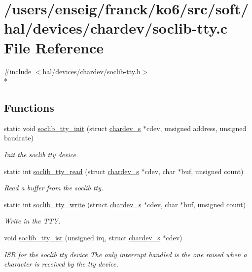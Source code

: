 \hypertarget{soclib-tty_8c}{\section{/users/enseig/franck/ko6/src/soft/hal/devices/chardev/soclib-\/tty.c File Reference}
\label{soclib-tty_8c}
}
{\ttfamily \#include $<$hal/devices/chardev/soclib-\/tty.\-h$>$}\\*
\subsection*{Functions}
\begin{DoxyCompactItemize}
\item 
static void \hyperlink{soclib-tty_8c_a00359850c297b2f0c2cf249274763e04}{soclib\-\_\-tty\-\_\-init} (struct \hyperlink{structchardev__s}{chardev\-\_\-s} $\ast$cdev, unsigned address, unsigned baudrate)
\begin{DoxyCompactList}\small\item\em Init the soclib tty device. \end{DoxyCompactList}\item 
static int \hyperlink{soclib-tty_8c_a4431857eb67ef282186a88fda6dcd89e}{soclib\-\_\-tty\-\_\-read} (struct \hyperlink{structchardev__s}{chardev\-\_\-s} $\ast$cdev, char $\ast$buf, unsigned count)
\begin{DoxyCompactList}\small\item\em Read a buffer from the soclib tty. \end{DoxyCompactList}\item 
static int \hyperlink{soclib-tty_8c_a6abd23ad0092762798c155784b37d60a}{soclib\-\_\-tty\-\_\-write} (struct \hyperlink{structchardev__s}{chardev\-\_\-s} $\ast$cdev, char $\ast$buf, unsigned count)
\begin{DoxyCompactList}\small\item\em Write in the T\-T\-Y. \end{DoxyCompactList}\item 
void \hyperlink{soclib-tty_8c_abee08020bafa1f698839a8d477dcdafa}{soclib\-\_\-tty\-\_\-isr} (unsigned irq, struct \hyperlink{structchardev__s}{chardev\-\_\-s} $\ast$cdev)
\begin{DoxyCompactList}\small\item\em I\-S\-R for the soclib tty device The only interrupt handled is the one raised when a character is received by the tty device. \end{DoxyCompactList}\end{DoxyCompactItemize}
